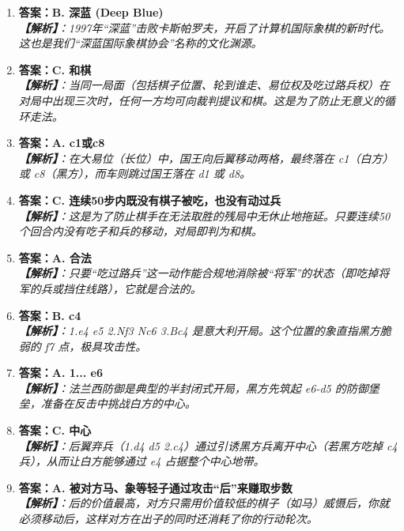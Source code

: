 \documentclass[a4paper, 11pt]{ctexart}
\begin{document}
\begin{enumerate}[label=\arabic*., itemsep=1.5em]
    \item \textbf{答案：B. 深蓝 (Deep Blue)} \\
    \textit{\textbf{【解析】}：1997年“深蓝”击败卡斯帕罗夫，开启了计算机国际象棋的新时代。这也是我们“深蓝国际象棋协会”名称的文化渊源。}
\item \textbf{答案：C. 和棋} \\
    \textit{\textbf{【解析】}：当同一局面（包括棋子位置、轮到谁走、易位权及吃过路兵权）在对局中出现三次时，任何一方均可向裁判提议和棋。这是为了防止无意义的循环走法。}

    \item \textbf{答案：A. c1或c8} \\
    \textit{\textbf{【解析】}：在大易位（长位）中，国王向后翼移动两格，最终落在 c1（白方）或 c8（黑方），而车则跳过国王落在 d1 或 d8。}

    \item \textbf{答案：C. 连续50步内既没有棋子被吃，也没有动过兵} \\
    \textit{\textbf{【解析】}：这是为了防止棋手在无法取胜的残局中无休止地拖延。只要连续50个回合内没有吃子和兵的移动，对局即判为和棋。}

    \item \textbf{答案：A. 合法} \\
    \textit{\textbf{【解析】}：只要“吃过路兵”这一动作能合规地消除被“将军”的状态（即吃掉将军的兵或挡住线路），它就是合法的。}

    \item \textbf{答案：B. c4} \\
    \textit{\textbf{【解析】}：1.e4 e5 2.Nf3 Nc6 3.Bc4 是意大利开局。这个位置的象直指黑方脆弱的 f7 点，极具攻击性。}

    \item \textbf{答案：A. 1... e6} \\
    \textit{\textbf{【解析】}：法兰西防御是典型的半封闭式开局，黑方先筑起 e6-d5 的防御堡垒，准备在反击中挑战白方的中心。}

    \item \textbf{答案：C. 中心} \\
    \textit{\textbf{【解析】}：后翼弃兵（1.d4 d5 2.c4）通过引诱黑方兵离开中心（若黑方吃掉 c4 兵），从而让白方能够通过 e4 占据整个中心地带。}

    \item \textbf{答案：A. 被对方马、象等轻子通过攻击“后”来赚取步数} \\
    \textit{\textbf{【解析】}：后的价值最高，对方只需用价值较低的棋子（如马）威慑后，你就必须移动后，这样对方在出子的同时还消耗了你的行动轮次。}


\end{enumerate}
\end{document}
